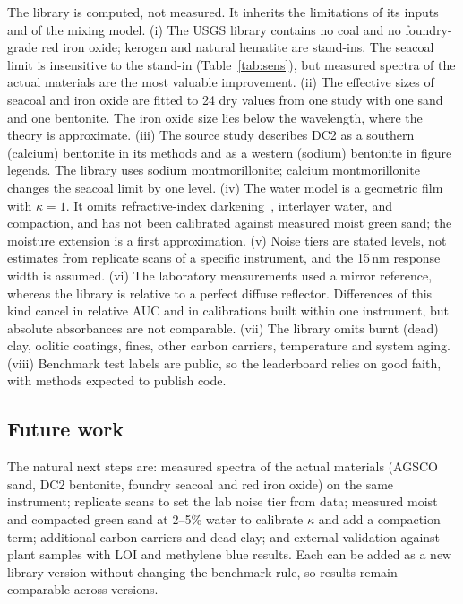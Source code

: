 \documentclass[10pt,twocolumn,letterpaper]{article}
\begin{document}
The library is computed, not measured. It inherits the limitations of its inputs and of the mixing model. (i) The USGS library contains no coal and no foundry-grade red iron oxide; kerogen and natural hematite are stand-ins. The seacoal limit is insensitive to the stand-in (Table~\ref{tab:sens}), but measured spectra of the actual materials are the most valuable improvement. (ii) The effective sizes of seacoal and iron oxide are fitted to 24 dry values from one study with one sand and one bentonite. The iron oxide size lies below the wavelength, where the theory is approximate. (iii) The source study describes DC2 as a southern (calcium) bentonite in its methods and as a western (sodium) bentonite in figure legends. The library uses sodium montmorillonite; calcium montmorillonite changes the seacoal limit by one level. (iv) The water model is a geometric film with $\kappa=1$. It omits refractive-index darkening~\cite{lekner1988}, interlayer water, and compaction, and has not been calibrated against measured moist green sand; the moisture extension is a first approximation. (v) Noise tiers are stated levels, not estimates from replicate scans of a specific instrument, and the 15\,nm response width is assumed. (vi) The laboratory measurements used a mirror reference, whereas the library is relative to a perfect diffuse reflector. Differences of this kind cancel in relative AUC and in calibrations built within one instrument, but absolute absorbances are not comparable. (vii) The library omits burnt (dead) clay, oolitic coatings, fines, other carbon carriers, temperature and system aging. (viii) Benchmark test labels are public, so the leaderboard relies on good faith, with methods expected to publish code.

\subsection{Future work}

The natural next steps are: measured spectra of the actual materials (AGSCO sand, DC2 bentonite, foundry seacoal and red iron oxide) on the same instrument; replicate scans to set the lab noise tier from data; measured moist and compacted green sand at 2--5\% water to calibrate $\kappa$ and add a compaction term; additional carbon carriers and dead clay; and external validation against plant samples with LOI and methylene blue results. Each can be added as a new library version without changing the benchmark rule, so results remain comparable across versions.
\end{document}

